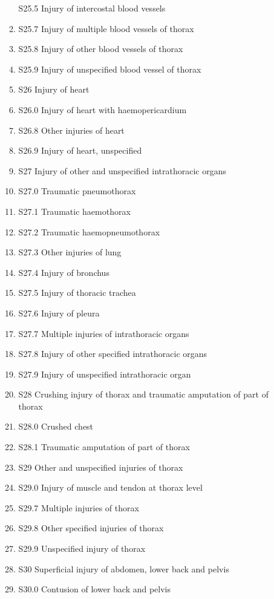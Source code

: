 \documentclass[
]{scrartcl}
\begin{document}
\begin{itemize}
\begin{enumerate}
    S25.5 Injury of intercostal blood vessels
  \item
    S25.7 Injury of multiple blood vessels of thorax
  \item
    S25.8 Injury of other blood vessels of thorax
  \item
    S25.9 Injury of unspecified blood vessel of thorax
  \item
    S26 Injury of heart
  \item
    S26.0 Injury of heart with haemopericardium
  \item
    S26.8 Other injuries of heart
  \item
    S26.9 Injury of heart, unspecified
  \item
    S27 Injury of other and unspecified intrathoracic organs
  \item
    S27.0 Traumatic pneumothorax
  \item
    S27.1 Traumatic haemothorax
  \item
    S27.2 Traumatic haemopneumothorax
  \item
    S27.3 Other injuries of lung
  \item
    S27.4 Injury of bronchus
  \item
    S27.5 Injury of thoracic trachea
  \item
    S27.6 Injury of pleura
  \item
    S27.7 Multiple injuries of intrathoracic organs
  \item
    S27.8 Injury of other specified intrathoracic organs
  \item
    S27.9 Injury of unspecified intrathoracic organ
  \item
    S28 Crushing injury of thorax and traumatic amputation of part of
    thorax
  \item
    S28.0 Crushed chest
  \item
    S28.1 Traumatic amputation of part of thorax
  \item
    S29 Other and unspecified injuries of thorax
  \item
    S29.0 Injury of muscle and tendon at thorax level
  \item
    S29.7 Multiple injuries of thorax
  \item
    S29.8 Other specified injuries of thorax
  \item
    S29.9 Unspecified injury of thorax
  \item
    S30 Superficial injury of abdomen, lower back and pelvis
  \item
    S30.0 Contusion of lower back and pelvis

\end{enumerate}
\end{itemize}
\end{document}
